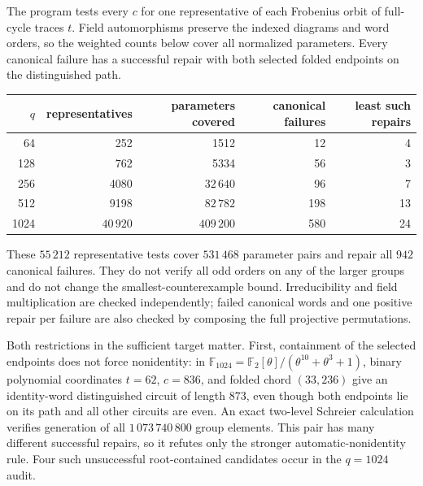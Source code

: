\documentclass[11pt,a4paper]{article}
\theoremstyle{definition}
\theoremstyle{remark}
\begin{document}
The program  tests every $c$ for one representative of each Frobenius orbit of full-cycle traces $t$.  Field automorphisms preserve the indexed diagrams and word orders, so the weighted counts below cover all normalized parameters.  Every canonical failure has a successful repair with both selected folded endpoints on the distinguished path.
\begin{center}
\begin{tabular}{rrrrr}
\toprule
$q$ & representatives & parameters covered & canonical failures & least such repairs\\
\midrule
64 & 252 & 1512 & 12 & 4\\
128 & 762 & 5334 & 56 & 3\\
256 & 4080 & $32\,640$ & 96 & 7\\
512 & 9198 & $82\,782$ & 198 & 13\\
1024 & $40\,920$ & $409\,200$ & 580 & 24\\
\bottomrule
\end{tabular}
\end{center}
These $55\,212$ representative tests cover $531\,468$ parameter pairs and repair all $942$ canonical failures.  They do not verify all odd orders on any of the larger groups and do not change the smallest-counterexample bound.  Irreducibility and field multiplication are checked independently; failed canonical words and one positive repair per failure are also checked by composing the full projective permutations.

Both restrictions in the sufficient target matter.  First, containment of the selected endpoints does not force nonidentity: in $\mathbb F_{1024}=\mathbb F_2[\theta]/(\theta^{10}+\theta^3+1)$, binary polynomial coordinates $t=62$, $c=836$, and folded chord $(33,236)$ give an identity-word distinguished circuit of length $873$, even though both endpoints lie on its path and all other circuits are even.  An exact two-level Schreier calculation verifies generation of all $1\,073\,740\,800$ group elements.  This pair has many different successful repairs, so it refutes only the stronger automatic-nonidentity rule.  Four such unsuccessful root-contained candidates occur in the $q=1024$ audit.
\end{document}
